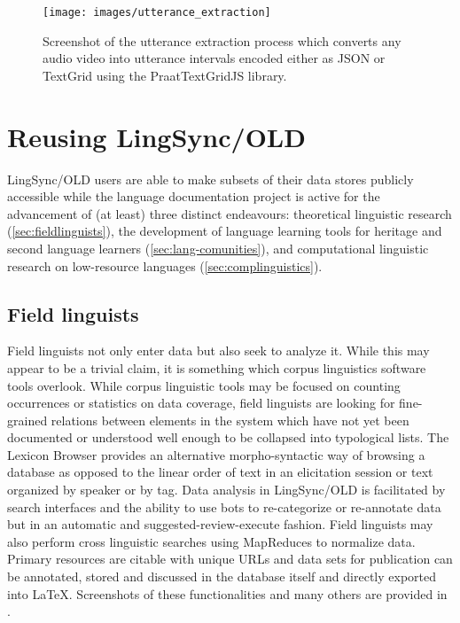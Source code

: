 \documentclass[11pt]{article}
\begin{document}
\begin{figure}
\begin{center}
\texttt{[image: images/utterance\_extraction]}
\caption{Screenshot of the utterance extraction process which converts any
audio video into utterance intervals encoded either as JSON or TextGrid using
the PraatTextGridJS library.}
\label{utterance_extraction_screenshot}
\end{center}
\end{figure}


\section{Reusing LingSync/OLD}\label{open-data}

LingSync/OLD users are able to make subsets of their data stores publicly
accessible while the language documentation project is active for the
advancement of (at least) three distinct endeavours: theoretical linguistic
research (\autoref{sec:fieldlinguists}), the development of language learning
tools for heritage and second language learners
(\autoref{sec:lang-comunities}), and computational linguistic research on
low-resource languages (\autoref{sec:complinguistics}).



\subsection{Field linguists}\label{sec:fieldlinguists}

Field linguists not only enter data but also seek to analyze it. While this may
appear to be a trivial claim, it is something which corpus linguistics software
tools overlook. While corpus linguistic tools may be focused on counting
occurrences or statistics on data coverage, field linguists are looking for
fine-grained relations between elements in the system which have not yet been
documented or understood well enough to be collapsed into typological lists.
The Lexicon Browser provides an alternative morpho-syntactic way of browsing a
database as opposed to the linear order of text in an elicitation session or
text organized by speaker or by tag. Data analysis in LingSync/OLD is
facilitated by search  interfaces and the ability to use bots to re-categorize
or re-annotate data but in an automatic and suggested-review-execute fashion.
Field linguists may also perform cross linguistic searches using MapReduces to
normalize data. Primary resources are citable with unique URLs and data sets
for publication can be annotated, stored and discussed in the database itself
and directly exported into LaTeX.  Screenshots of these functionalities and
many others are provided in \cite{lingsync:2012}.
\end{document}
